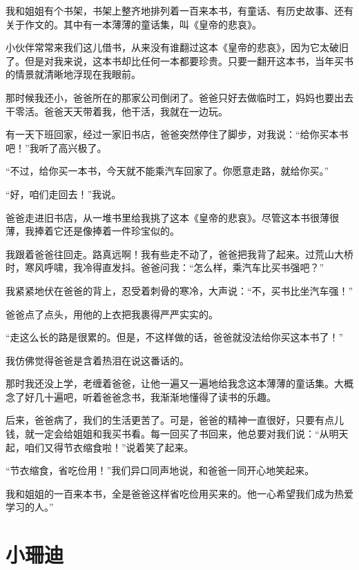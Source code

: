 \documentclass[12pt,UTF-8,openany]{ctexbook}
\begin{document}
\begin{large}
    
    我和姐姐有个书架，书架上整齐地排列着一百来本书，有童话、有历史故事、还有关于作文的。其中有一本薄薄的童话集，叫《皇帝的悲哀》。
    
    小伙伴常常来我们这儿借书，从来没有谁翻过这本《皇帝的悲哀》，因为它太破旧了。但是对我来说，这本书却比任何一本都要珍贵。只要一翻开这本书，当年买书的情景就清晰地浮现在我眼前。
    
    那时候我还小，爸爸所在的那家公司倒闭了。爸爸只好去做临时工，妈妈也要出去干零活。爸爸天天带着我，他干活，我就在一边玩。
    
    有一天下班回家，经过一家旧书店，爸爸突然停住了脚步，对我说：“给你买本书吧！”我听了高兴极了。
    
    “不过，给你买一本书，今天就不能乘汽车回家了。你愿意走路，就给你买。”
    
    “好，咱们走回去！”我说。
    
    爸爸走进旧书店，从一堆书里给我挑了这本《皇帝的悲哀》。尽管这本书很薄很薄，我捧着它还是像捧着一件珍宝似的。
    
    我跟着爸爸往回走。路真远啊！我有些走不动了，爸爸把我背了起来。过荒山大桥时，寒风呼啸，我冷得直发抖。爸爸问我：“怎么样，乘汽车比买书强吧？”
    
    我紧紧地伏在爸爸的背上，忍受着刺骨的寒冷，大声说：“不，买书比坐汽车强！”
    
    爸爸点了点头，用他的上衣把我裹得严严实实的。
    
    “走这么长的路是很累的。但是，不这样做的话，爸爸就没法给你买这本书了！”
    
    我仿佛觉得爸爸是含着热泪在说这番话的。
    
    那时我还没上学，老缠着爸爸，让他一遍又一遍地给我念这本薄薄的童话集。大概念了好几十遍吧，听着爸爸念书，我渐渐地懂得了读书的乐趣。
    
    后来，爸爸病了，我们的生活更苦了。可是，爸爸的精神一直很好，只要有点儿钱，就一定会给姐姐和我买书看。每一回买了书回来，他总要对我们说：“从明天起，咱们又得节衣缩食啦！”说着笑了起来。
    
    “节衣缩食，省吃俭用！”我们异口同声地说，和爸爸一同开心地笑起来。
    
    我和姐姐的一百来本书，全是爸爸这样省吃俭用买来的。他一心希望我们成为热爱学习的人。”
    
\end{large}



\chapter{小珊迪}
\end{document}
